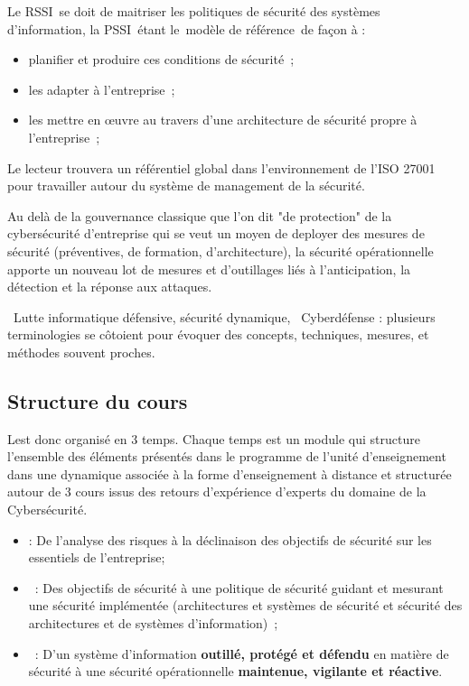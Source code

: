 Le RSSI se doit de maitriser les politiques de sécurité des systèmes d'information,  la PSSI étant le modèle de référence de façon à :
\begin{itemize}
\item planifier et produire ces conditions de sécurité ;
\item les adapter à l'entreprise ;
\item les mettre en œuvre au travers d'une architecture de sécurité propre à l'entreprise ;
\end{itemize}

Le lecteur trouvera un référentiel global dans l'environnement de l'ISO 27001 pour travailler autour du système de management de la sécurité.

Au delà de la gouvernance classique que l'on dit "de protection" de la cybersécurité d'entreprise qui se veut un moyen de deployer des mesures de sécurité (préventives, de formation, d'architecture), la sécurité opérationnelle apporte un nouveau lot de mesures et d'outillages liés à l'anticipation, la détection et la réponse aux attaques.

\begin{nota} Lutte informatique défensive, sécurité dynamique, 
Cyberdéfense : plusieurs terminologies se côtoient pour évoquer des concepts, techniques, mesures, et méthodes souvent proches. 
\end{nota}


\subsection{Structure du cours}

L\ecours est donc organisé en 3 temps. Chaque temps est un module qui structure l'ensemble des éléments présentés dans le programme de l'unité d'enseignement dans une dynamique associée à la forme d'enseignement à distance et structurée autour de 3 cours issus des retours d'expérience d'experts du domaine de la Cybersécurité.  
\begin{itemize}
\item {} : De l'analyse des risques à la déclinaison des objectifs de sécurité sur les essentiels de l'entreprise;
\item {} : Des objectifs de sécurité à une politique de sécurité guidant et mesurant une sécurité implémentée (architectures et systèmes  de sécurité et sécurité des architectures et de systèmes d'information) ;
\item {} : D'un système d'information \textbf{outillé, protégé et défendu} en matière de sécurité à une sécurité opérationnelle \textbf{maintenue, vigilante et  réactive}.
\end{itemize}

